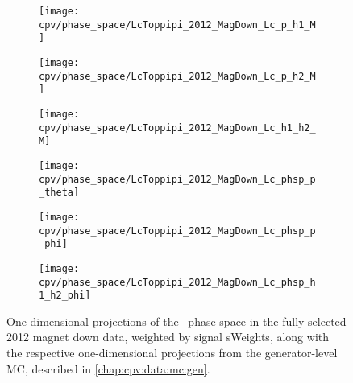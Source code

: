 \begin{figure}
  \centering
  \begin{subfigure}{0.4\textwidth}
    \texttt{[image: cpv/phase\_space/LcToppipi\_2012\_MagDown\_Lc\_p\_h1\_M]}
    \label{fig:cpv:phsp:data:ppipi:msqphm}
  \end{subfigure}
  \begin{subfigure}{0.4\textwidth}
    \texttt{[image: cpv/phase\_space/LcToppipi\_2012\_MagDown\_Lc\_p\_h2\_M]}
    \label{fig:cpv:phsp:data:ppipi:msqphp}
  \end{subfigure}
  \begin{subfigure}{0.4\textwidth}
    \texttt{[image: cpv/phase\_space/LcToppipi\_2012\_MagDown\_Lc\_h1\_h2\_M]}
    \label{fig:cpv:phsp:data:ppipi:msqhh}
  \end{subfigure}
  \begin{subfigure}{0.4\textwidth}
    \texttt{[image: cpv/phase\_space/LcToppipi\_2012\_MagDown\_Lc\_phsp\_p\_theta]}
    \label{fig:cpv:phsp:data:ppipi:proton_theta}
  \end{subfigure}
  \begin{subfigure}{0.4\textwidth}
    \texttt{[image: cpv/phase\_space/LcToppipi\_2012\_MagDown\_Lc\_phsp\_p\_phi]}
    \label{fig:cpv:phsp:data:ppipi:proton_phi}
  \end{subfigure}
  \begin{subfigure}{0.4\textwidth}
    \texttt{[image: cpv/phase\_space/LcToppipi\_2012\_MagDown\_Lc\_phsp\_h1\_h2\_phi]}
    \label{fig:cpv:phsp:data:ppipi:h1_h2_phi}
  \end{subfigure}
  \caption{%
    One dimensional projections of the \LcToppipi\ phase space in the fully 
    selected 2012 magnet down data, weighted by signal sWeights, along with the 
    respective one-dimensional projections from the generator-level \ac{MC}, 
    described in \cref{chap:cpv:data:mc:gen}.
  }
  \label{fig:cpv:phsp:data_1D:ppipi}
\end{figure}

